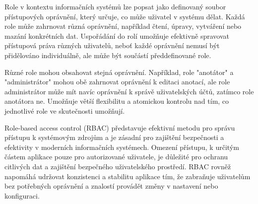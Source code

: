 Role v kontextu informačních systémů lze popsat jako definovaný soubor přístupových oprávnění, který určuje, co může uživatel v systému dělat. Každá role může zahrnovat různá oprávnění, například čtení, úpravy, vytváření nebo mazání konkrétních dat. Uspořádání do rolí umožňuje efektivně spravovat přístupová práva různých uživatelů, neboť každé oprávnění nemusí být přidělováno individuálně, ale může být součástí předdefinované role.

Různé role mohou obsahovat stejná oprávnění. Například, role "anotátor" a "administrátor" mohou obě zahrnovat oprávnění k editaci anotací, ale role administrátor může mít navíc oprávnění k správě uživatelských účtů, zatímco role anotátora ne. Umožňuje větší flexibilitu a atomickou kontrolu nad tím, co jednotlivé role ve skutečnosti umožňují.

Role-based access control (RBAC) představuje efektivní metodu pro správu přístupu k systémovým zdrojům a je zásadní pro zajištění bezpečnosti a efektivity v moderních informačních systémech. Omezení přístupu, k určitým částem aplikace pouze pro autorizované uživatele, je důležité pro ochranu citlivých dat a zajištění bezpečného uživatelského prostředí. RBAC rovněž napomáhá udržovat konzistenci a stabilitu aplikace tím, že zabraňuje uživatelům bez potřebných oprávnění a znalostí provádět změny v nastavení nebo konfiguraci. \cite{ferraiolo1992role}
